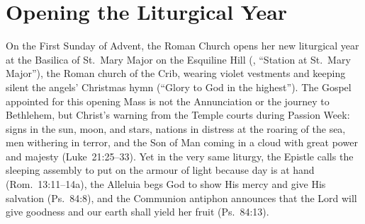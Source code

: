 \section{Opening the Liturgical Year}

On the First Sunday of Advent, the Roman Church opens her new liturgical year at the Basilica of St.~Mary Major on the Esquiline Hill (, ``Station at St.~Mary Major''), the Roman church of the Crib, wearing violet vestments and keeping silent the angels' Christmas hymn  (``Glory to God in the highest''). The Gospel appointed for this opening Mass is not the Annunciation or the journey to Bethlehem, but Christ's warning from the Temple courts during Passion Week: signs in the sun, moon, and stars, nations in distress at the roaring of the sea, men withering in terror, and the Son of Man coming in a cloud with great power and majesty (Luke~21:25--33). Yet in the very same liturgy, the Epistle calls the sleeping assembly to put on the armour of light because day is at hand (Rom.~13:11--14a), the Alleluia begs God to show His mercy and give His salvation (Ps.~84:8), and the Communion antiphon announces that the Lord will give goodness and our earth shall yield her fruit (Ps.~84:13).

